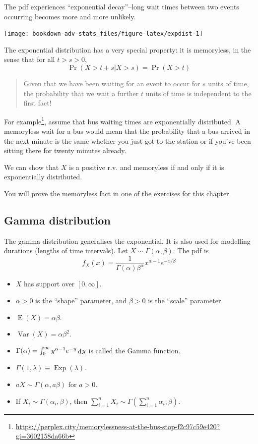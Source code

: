 \documentclass[
]{book}
\providecommand{\tightlist}{%
  \setlength{\itemsep}{0pt}\setlength{\parskip}{0pt}}
\DeclareMathOperator{\E}{E}
\DeclareMathOperator{\Var}{Var}
\DeclareMathOperator{\Exp}{Exp}
\DeclareMathOperator{\dd}{d}
\newcommand{\dint}{\dd\hspace{0.5pt}\!}
\theoremstyle{definition}
\theoremstyle{definition}
\theoremstyle{definition}
\theoremstyle{definition}
\theoremstyle{remark}
\begin{document}
The pdf experiences ``exponential decay''--long wait times between two events occurring becomes more and more unlikely.

\begin{center}\texttt{[image: bookdown-adv-stats\_files/figure-latex/expdist-1]} \end{center}

The exponential distribution has a very special property: it is
memoryless, in the sense that for all \(t>s>0\),
\[
\Pr(X > t+s|X>s) = \Pr(X > t)
\]

\begin{quote}
Given that we have been waiting for an event to occur for \(s\) units of time, the probability that we wait a further \(t\) units of time is independent to the first fact!
\end{quote}

For example\footnote{\footnotetext\url{https://perplex.city/memorylessness-at-the-bus-stop-f2c97c59e420?gi=3602158da66b}}, assume that bus waiting times are exponentially distributed. A memoryless wait for a bus would mean that the probability that a bus arrived in the next minute is the same whether you just got to the station or if you've been sitting there for twenty minutes already.

We can show that \(X\) is a positive r.v. and memoryless if and only if it is exponentially distributed.

You will prove the memoryless fact in one of the exercises for this chapter.

\hypertarget{gamma-distribution}{%
\subsection{Gamma distribution}\label{gamma-distribution}}

The gamma distribution generalises the exponential.
It is also used for modelling durations (lengths of time intervals).
Let \(X\sim\Gamma(\alpha,\beta)\).
The pdf is
\[
  f_X(x) = \frac{1}{\Gamma(\alpha)\beta^\alpha} x^{\alpha-1} e^{- x/\beta}
\]

\begin{itemize}
\tightlist
\item
  \(X\) has support over \([0,\infty]\).
\item
  \(\alpha>0\) is the ``shape'' parameter, and \(\beta >0\) is the ``scale'' parameter.
\item
  \(\E(X)=\alpha\beta\).
\item
  \(\Var(X)=\alpha\beta^2\).
\item
  \(\Gamma(\alpha)=\int_0^\infty y^{\alpha-1}e^{-y}\dint y\) is called the Gamma function.
\item
  \(\Gamma(1,\lambda) \equiv \Exp(\lambda)\).
\item
  \(aX\sim\Gamma(\alpha,a\beta)\) for \(a>0\).
\item
  If \(X_i\sim\Gamma(\alpha_i,\beta)\), then \(\sum_{i=1}^n X_i \sim \Gamma(\sum_{i=1}^n \alpha_i,\beta)\).
\end{itemize}
\end{document}
